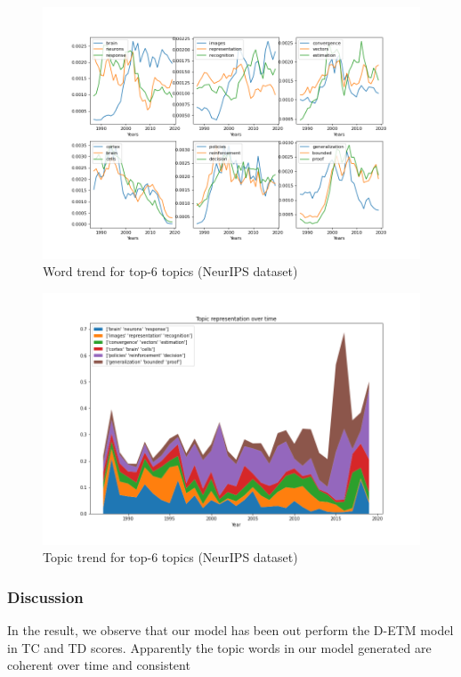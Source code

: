 \begin{figure}
\centering
\includegraphics[width=1\linewidth]{figures/1128/scatter(2)}
\caption{Word trend for top-6 topics (NeurIPS dataset)}
\label{fig:scatter2}
\end{figure}
\begin{figure}
\centering
\includegraphics[width=1\linewidth]{figures/1128/stack(2)}
\caption{Topic trend for top-6 topics (NeurIPS dataset)}
\label{fig:stack2}
\end{figure}
\subsubsection{Discussion}
In the result, we observe that our model has been out perform the D-ETM model in TC and TD scores. Apparently the topic words in our model generated are coherent over time and consistent 